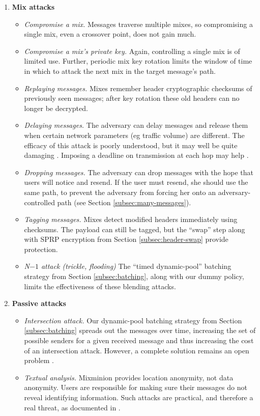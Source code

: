 \documentclass[final]{ieee}
\begin{document}
\begin{enumerate}
\item \textbf{Mix attacks}

\begin{itemize}
\item \emph{Compromise a mix.} Messages traverse multiple mixes, so
compromising a single mix, even a crossover point, does not gain much.
\item \emph{Compromise a mix's private key.} Again, controlling a single mix
is of limited use. Further, periodic mix key rotation limits the window
of time in which to attack the next mix in the target message's path.
\item \emph{Replaying messages.}  Mixes remember header cryptographic 
checksums of
previously seen messages; after key rotation these old headers can no
longer be decrypted.
\item \emph{Delaying messages.} The adversary can delay messages and
release them when certain network parameters (eg traffic volume) are
different. The efficacy of this attack is poorly understood, but it may
well be quite damaging \cite{trickle02}. Imposing a deadline on
transmission at each hop may help \cite{mix-acc}.
\item \emph{Dropping messages.} The adversary can drop messages with the
hope that users will notice and resend. If the user must resend, she
should use the same path, to prevent the adversary from forcing her onto
an adversary-controlled path (see Section \ref{subsec:many-messages}).
\item \emph{Tagging messages.} Mixes detect modified headers immediately
using checksums. The payload can still be tagged, but the ``swap'' step
along with SPRP encryption from Section \ref{subsec:header-swap}
provide protection.
\item \emph{N$-1$ attack (trickle, flooding)} The ``timed dynamic-pool''
batching strategy from Section \ref{subsec:batching}, along with our dummy
policy, limits the effectiveness of these blending attacks.
\end{itemize}

\item \textbf{Passive attacks}

\begin{itemize}
\item \emph{Intersection attack.} Our dynamic-pool batching strategy
from Section \ref{subsec:batching} spreads out the messages over time,
increasing the set of possible senders for a given received message and
thus increasing the cost of an intersection attack. However, a complete
solution remains an open problem \cite{langos02}.
\item \emph{Textual analysis.} Mixminion provides location anonymity,
not data anonymity. Users are responsible for making sure their messages
do not reveal identifying information. Such attacks are practical, and
therefore a real threat, as documented in \cite{rao-pseudonymity}.
\end{itemize}


\end{enumerate}
\end{document}
